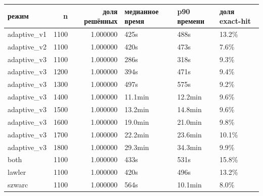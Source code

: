 \begin{tabular}{lrrlll}
\toprule
режим & n & доля решённых & медианное время & p90 времени & доля exact-hit \\
\midrule
adaptive\_v1 & 1100 & 1.000000 & 425s & 488s & 13.2\% \\
adaptive\_v2 & 1100 & 1.000000 & 420s & 473s & 7.6\% \\
adaptive\_v3 & 1100 & 1.000000 & 286s & 318s & 9.3\% \\
adaptive\_v3 & 1200 & 1.000000 & 394s & 471s & 9.4\% \\
adaptive\_v3 & 1300 & 1.000000 & 497s & 575s & 9.2\% \\
adaptive\_v3 & 1400 & 1.000000 & 11.1min & 12.2min & 9.6\% \\
adaptive\_v3 & 1500 & 1.000000 & 13.2min & 14.8min & 9.6\% \\
adaptive\_v3 & 1600 & 1.000000 & 19.0min & 21.0min & 9.8\% \\
adaptive\_v3 & 1700 & 1.000000 & 22.2min & 23.6min & 10.1\% \\
adaptive\_v3 & 1800 & 1.000000 & 29.3min & 34.3min & 9.9\% \\
both & 1100 & 1.000000 & 433s & 531s & 15.8\% \\
lawler & 1100 & 1.000000 & 420s & 496s & 13.2\% \\
szwarc & 1100 & 1.000000 & 564s & 10.1min & 8.0\% \\
\bottomrule
\end{tabular}
